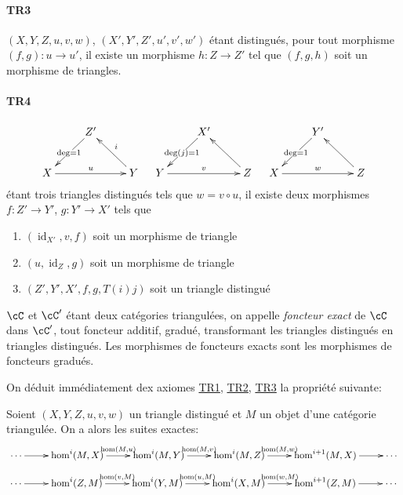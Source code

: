 \paragraph{TR3}
\hypertarget{VIII:TR3}{}

$(X,Y,Z,u,v,w)$, $(X',Y',Z',u',v',w')$ \'etant distingu\'es, pour tout 
morphisme $(f,g):u\to u'$, il existe un morphisme $h:Z\to Z'$ tel que $(f,g,h)$ 
soit un morphisme de triangles. 


\paragraph{TR4}
\hypertarget{VIII:TR4}{}

\[\xymatrix{
  & Z' \ar[dl]|{\deg=1} \\
  X \ar[rr]^-u 
    & & Y \ar[ul]_-i 
}\quad
\xymatrix{
  & X' \ar[dl]|{\deg(j)=1} \\
  Y \ar[rr]^-v 
    & & Z \ar[ul] 
}\quad
\xymatrix{
  & Y' \ar[dl]|{\deg=1} \\
  X \ar[rr]^-w 
    & & Z \ar[ul] 
}\]
\'etant trois triangles distingu\'es tels que $w=v\circ u$, il existe deux 
morphismes $f:Z'\to Y'$, $g:Y' \to X'$ tels que 
\begin{enumerate}
  \item $(\operatorname{id}_{X'}, v, f)$ soit un morphisme de triangle 
  \item $(u,\operatorname{id}_Z,g)$ soit un morphisme de triangle 
  \item $(Z',Y',X',f,g,T(i) j)$ soit un triangle distingu\'e
\end{enumerate}

$\cC$ et $\cC'$ \'etant deux cat\'egories triangul\'ees, on appelle 
\emph{foncteur exact} de $\cC$ dans $\cC'$, tout foncteur additif, gradu\'e, 
transformant les triangles distingu\'es en triangles distingu\'es. Les 
morphismes de foncteurs exacts sont les morphismes de foncteurs gradu\'es. 

On d\'eduit imm\'ediatement dex axiomes \hyperlink{VIII:TR1}{TR1}, 
\hyperlink{VIII:TR2}{TR2}, \hyperlink{VIII:TR3}{TR3} la propri\'et\'e suivante: 





\begin{proposition}\label{VIII:1-1-2}
Soient $(X,Y,Z,u,v,w)$ un triangle distingu\'e et $M$ un objet d'une 
cat\'egorie triangul\'ee. On a alors les suites exactes: 
\[\xymatrix{
  \cdots \ar[r] 
    & \hom^i(M,X) \ar[r]^-{\hom(M,u)} 
    & \hom^i(M,Y) \ar[r]^-{\hom(M,v)} 
    & \hom^i(M,Z) \ar[r]^-{\hom(M,w)} 
    & \hom^{i+1}(M,X) \ar[r] 
    & \cdots
}\]
\[\xymatrix{
  \cdots \ar[r] 
    & \hom^i(Z,M) \ar[r]^-{\hom(v,M)} 
    & \hom^i(Y,M) \ar[r]^-{\hom(u,M)} 
    & \hom^i(X,M) \ar[r]^-{\hom(w,M)} 
    & \hom^{i+1}(Z,M) \ar[r] 
    & \cdots
}\]
\end{proposition}

